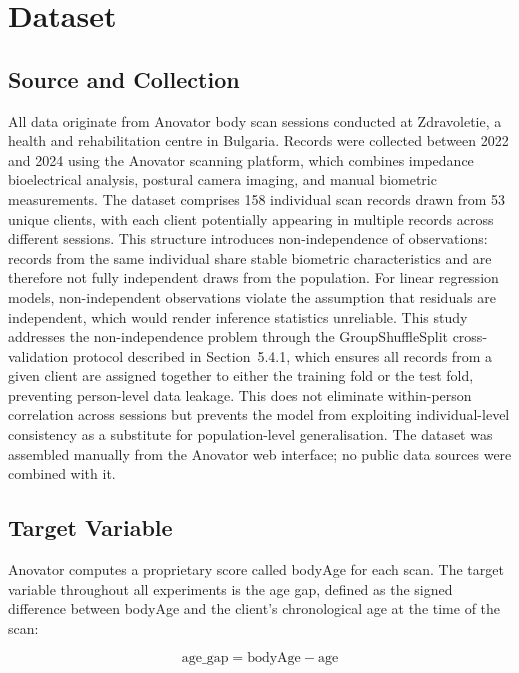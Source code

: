 \documentclass[11pt,a4paper]{report}
\begin{document}
\section{Dataset}

\subsection{Source and Collection}

All data originate from Anovator body scan sessions conducted at Zdravoletie, a health and
rehabilitation centre in Bulgaria. Records were collected between 2022 and 2024 using the Anovator
scanning platform, which combines impedance bioelectrical analysis, postural camera imaging, and
manual biometric measurements. The dataset comprises 158 individual scan records drawn from 53
unique clients, with each client potentially appearing in multiple records across different sessions.
This structure introduces non-independence of observations: records from the same individual share
stable biometric characteristics and are therefore not fully independent draws from the population.
For linear regression models, non-independent observations violate the assumption that residuals are
independent, which would render inference statistics unreliable. This study addresses the
non-independence problem through the GroupShuffleSplit cross-validation protocol described in
Section~5.4.1, which ensures all records from a given client are assigned together to either the
training fold or the test fold, preventing person-level data leakage. This does not eliminate
within-person correlation across sessions but prevents the model from exploiting individual-level
consistency as a substitute for population-level generalisation.
The dataset was assembled manually from the Anovator web interface; no public data sources were
combined with it.

\subsection{Target Variable}

Anovator computes a proprietary score called bodyAge for each scan. The target variable throughout
all experiments is the age gap, defined as the signed difference between bodyAge and the client's
chronological age at the time of the scan:

\begin{equation}
  \text{age\_gap} = \text{bodyAge} - \text{age}
\end{equation}
\end{document}

